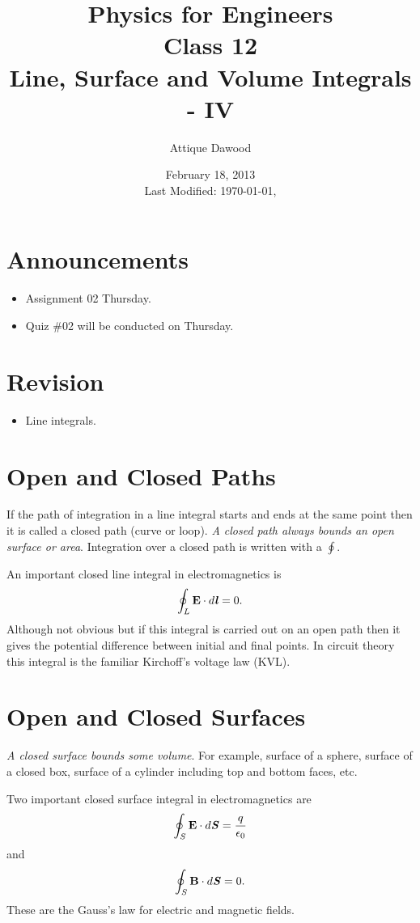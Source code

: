 \documentclass[12pt,a4paper]{article}
\title{\vspace{-2cm}Physics for Engineers\\Class 12\\Line, Surface and Volume Integrals - IV}
\author{Attique Dawood}
\date{February 18, 2013\\[0.2cm] Last Modified: \today, \currenttime}
\begin{document}
\maketitle
\section{Announcements}
\begin{itemize}
\item Assignment 02 Thursday.
\item Quiz \#02 will be conducted on Thursday.
\end{itemize}
\section{Revision}
\begin{itemize}
\item Line integrals.
\end{itemize}
\section{Open and Closed Paths}
If the path of integration in a line integral starts and ends at the same point then it is called a closed path (curve or loop). \textit{A closed path always bounds an open surface or area}. Integration over a closed path is written with a $\oint$.

An important closed line integral in electromagnetics is
\begin{equation}
\oint_L \textbf{E}\cdot d\textbf{\textit{l}}=0.
\end{equation}
Although not obvious but if this integral is carried out on an open path then it gives the potential difference between initial and final points. In circuit theory this integral is the familiar Kirchoff's voltage law (KVL).
\section{Open and Closed Surfaces}
\textit{A closed surface bounds some volume}. For example, surface of a sphere, surface of a closed box, surface of a cylinder including top and bottom faces, etc.

Two important closed surface integral in electromagnetics are
\begin{equation}
\oint_S \textbf{E}\cdot d\textbf{\textit{S}}=\dfrac{q}{\epsilon_0}
\end{equation}
and
\begin{equation}
\oint_S \textbf{B}\cdot d\textbf{\textit{S}}=0.
\end{equation}
These are the Gauss's law for electric and magnetic fields.
\end{document}
